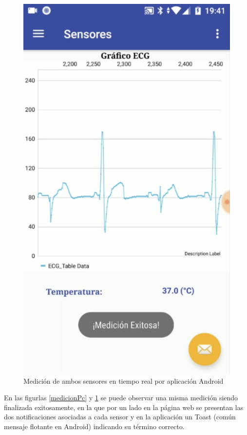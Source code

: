 \begin{figure}[H]
	\centering
	\includegraphics[scale=0.4]{figuras/protof/medicionApp.png}
	\caption{Medición de ambos sensores en tiempo real por aplicación Android}
	\label{medicionApp}
\end{figure}

En las figurlas \ref{medicionPc} y \ref{medicionApp} se puede observar una misma medición siendo finalizada exitosamente, en la que por un lado en la página web se presentan las dos notificaciones asociadas a cada sensor y en la aplicación un Toast (común mensaje flotante en Android) indicando su término correcto.

